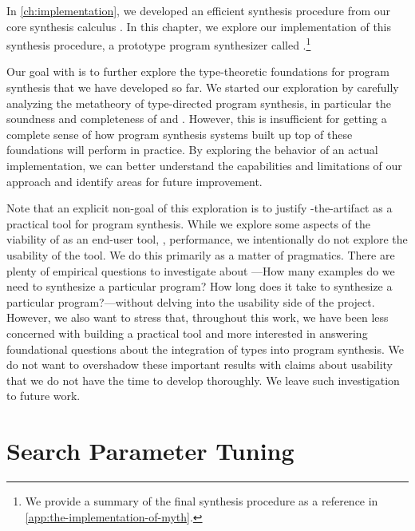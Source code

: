 In \autoref{ch:implementation}, we developed an efficient synthesis procedure from our core synthesis calculus \mlsyn{}.
In this chapter, we explore our implementation of this synthesis procedure, a prototype program synthesizer called \myth{}.\footnote{%
  We provide a summary of the final synthesis procedure as a reference in \autoref{app:the-implementation-of-myth}.
}

Our goal with \myth{} is to further explore the type-theoretic foundations for program synthesis that we have developed so far.
We started our exploration by carefully analyzing the metatheory of type-directed program synthesis, in particular the soundness and completeness of \lsyn{} and \mlsyn{}.
However, this is insufficient for getting a complete sense of how program synthesis systems built up top of these foundations will perform in practice.
By exploring the behavior of an actual implementation, we can better understand the capabilities and limitations of our approach and identify areas for future improvement.

Note that an explicit non-goal of this exploration is to justify \myth{}-the-artifact as a practical tool for program synthesis.
While we explore some aspects of the viability of \myth{} as an end-user tool, \eg, performance, we intentionally do not explore the usability of the tool.
We do this primarily as a matter of pragmatics.
There are plenty of empirical questions to investigate about \myth{}---How many examples do we need to synthesize a particular program?  How long does it take to synthesize a particular program?---without delving into the usability side of the project.
However, we also want to stress that, throughout this work, we have been less concerned with building a practical tool and more interested in answering foundational questions about the integration of types into program synthesis.
We do not want to overshadow these important results with claims about usability that we do not have the time to develop thoroughly.
We leave such investigation to future work.

\section{Search Parameter Tuning}
\label{sec:search-parameter-tuning}

